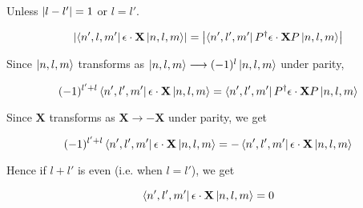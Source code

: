 Unless  $\abs{l - l'} = 1$ or $l = l'$. 

\begin{equation}
    \abs{\bra{n',l,m'} \mathbf{\epsilon} \cdot \mathbf{X} \ket{n,l,m}} = \abs{\bra{n',l',m'} P^{\dagger} \mathbf{\epsilon}\cdot \mathbf{X}  P  \ket{n,l,m}} 
\end{equation}

Since $\ket{n,l,m}$ transforms as $\ket{n,l,m} \longrightarrow (-1)^l \ket{n,l,m}$ under parity,

\begin{equation}
    (-1)^{l' + l}\bra{n',l',m'} \mathbf{\epsilon} \cdot \mathbf{X} \ket{n,l,m} = \bra{n',l',m'} P^\dagger  \mathbf{\epsilon}\cdot \mathbf{X} P \ket{n,l,m}
\end{equation}

Since $ \mathbf{X}  $ transforms as $ \mathbf{X}   \longrightarrow - \mathbf{X}  $ under parity, we get

\begin{equation}
    (-1)^{l' + l}\bra{n',l',m'} \mathbf{\epsilon} \cdot \mathbf{X} \ket{n,l,m} = -\bra{n',l',m'}  \mathbf{\epsilon}\cdot \mathbf{X}\ket{n,l,m}
\end{equation}

Hence if $l + l'$ is even (i.e. when $l = l'$), we get 

\begin{equation}
    \bra{n',l',m'} \mathbf{\epsilon} \cdot \mathbf{X} \ket{n,l,m} = 0
\end{equation}
